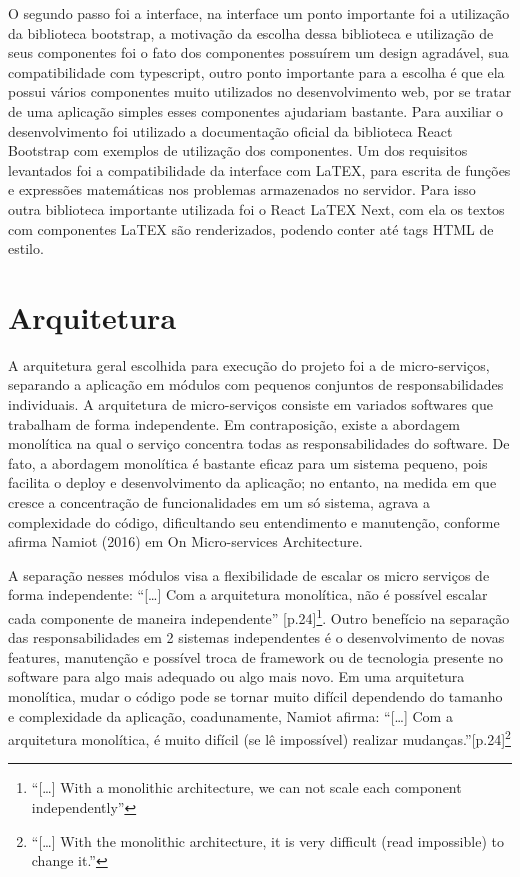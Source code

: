 O segundo passo foi a interface, na interface um ponto importante foi a utilização da biblioteca bootstrap, a motivação da escolha dessa biblioteca e utilização de seus componentes foi o fato dos componentes possuírem um design agradável, sua compatibilidade com typescript, outro ponto importante para a escolha é que ela possui vários componentes muito utilizados no desenvolvimento web, por se tratar de uma aplicação simples esses componentes ajudariam bastante. Para auxiliar o desenvolvimento foi utilizado a documentação oficial da biblioteca React Bootstrap com exemplos de utilização dos componentes. Um dos requisitos levantados foi a compatibilidade da interface com LaTEX, para escrita de funções e expressões matemáticas nos problemas armazenados no servidor. Para isso outra biblioteca importante utilizada foi o React LaTEX Next, com ela os textos com componentes LaTEX são renderizados, podendo conter até tags HTML de estilo.

\section{Arquitetura}

A arquitetura geral escolhida para execução do projeto foi a de micro-serviços, separando a aplicação em módulos com pequenos conjuntos de responsabilidades individuais. A arquitetura de micro-serviços consiste em variados softwares que trabalham de forma independente. Em contraposição, existe a abordagem monolítica na qual o serviço concentra todas as responsabilidades do software. De fato, a abordagem monolítica é bastante eficaz para um sistema pequeno, pois facilita o deploy e desenvolvimento da aplicação; no entanto, na medida em que cresce a concentração de funcionalidades em um só sistema, agrava a complexidade do código, dificultando seu entendimento e manutenção, conforme afirma Namiot (2016) em On Micro-services Architecture.

A separação nesses módulos visa a flexibilidade de escalar os micro serviços de forma independente: ``[\dots] Com a arquitetura monolítica, não é possível escalar cada componente de maneira independente'' \cite[tradução nossa]{namiot_d:OMSA}[p.24]\footnote{``[\dots] With a monolithic architecture, we can not scale each component independently''}. Outro benefício na separação das responsabilidades em 2 sistemas independentes é o desenvolvimento de novas features, manutenção e possível troca de framework ou de tecnologia presente no software para algo mais adequado ou algo mais novo. Em uma arquitetura monolítica, mudar o código pode se tornar muito difícil dependendo do tamanho e complexidade da aplicação, coadunamente, Namiot afirma: ``[\dots] Com a arquitetura monolítica, é muito difícil (se lê impossível) realizar mudanças.''\cite[tradução nossa]{namiot_d:OMSA}[p.24]\footnote{``[\dots] With the monolithic architecture, it is very difficult (read impossible) to change it.''}

